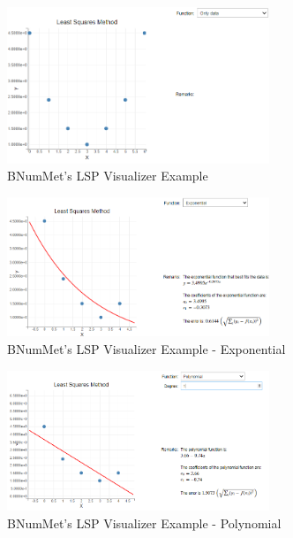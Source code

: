 \begin{figure}[H]
    \centering
    \includegraphics[width=0.7\textwidth]{Include/Images/Thesis/Development/Visualizers/LSP/BNumMet.LSP.Ex1.png}
    \caption{BNumMet's LSP Visualizer Example }
    \label{fig:BNumMet's Least Squares Visualizer Example}
\end{figure}
\begin{figure}[H]
    \centering
    \includegraphics[width=0.7\textwidth]{Include/Images/Thesis/Development/Visualizers/LSP/BNumMet.LSP.Ex1.1.png}
    \caption{BNumMet's LSP Visualizer Example - Exponential}
    \label{fig:BNumMet's Least Squares Visualizer Example- Exponential}
\end{figure}
\begin{figure}[H]
    \centering
    \includegraphics[width=0.7\textwidth]{Include/Images/Thesis/Development/Visualizers/LSP/BNumMet.LSP.Ex1.2.png}
    \caption{BNumMet's LSP Visualizer Example - Polynomial}
    \label{fig:BNumMet's Least Squares Visualizer Example- Polynomial}
\end{figure}
